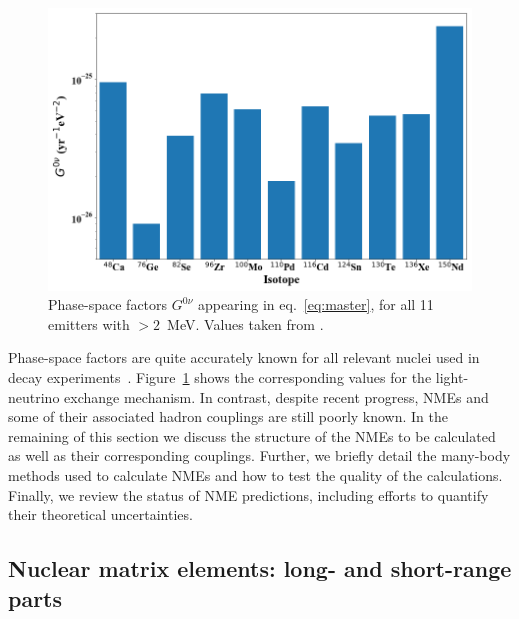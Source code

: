 \begin{figure}[t]
	\begin{center}
	\includegraphics[width=\textwidth]{img/g0nu.png} 	\caption{Phase-space factors $G^{0\nu}$ appearing in eq.~\ref{eq:master}, for all 11 \bb emitters with \Qbb$>2$~MeV. Values taken from \cite{Kotila:2012zza}.
 \label{fig:phase_space}}
	\end{center}
\end{figure}

Phase-space factors are quite accurately known for all relevant nuclei used in \bbonu decay experiments~\cite{Kotila:2012zza,Stoica:2013lka}. Figure~\ref{fig:phase_space} shows the corresponding values for the light-neutrino exchange mechanism.
In contrast, despite recent progress, NMEs and some of their associated hadron couplings are still poorly known. In the remaining of this section we discuss the structure of the NMEs to be calculated as well as their corresponding couplings. Further, we briefly detail the many-body methods used to calculate NMEs and how to test the quality of the calculations. Finally, we review the status of NME predictions, including efforts to quantify their theoretical uncertainties.

\subsection{Nuclear matrix elements: long- and short-range parts}
\label{subsec:nme_parts}

